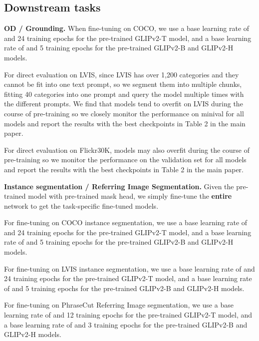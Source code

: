 \documentclass{article}
\newcommand{\ourT}{GLIPv2-T\xspace}
\newcommand{\ourB}{GLIPv2-B\xspace}
\newcommand{\ourH}{GLIPv2-H\xspace}
\begin{document}
\subsection{Downstream tasks}

\textbf{OD / Grounding.} When fine-tuning on COCO, we use a base learning rate of  and 24 training epochs for the pre-trained \ourT model, and a base learning rate of  and 5 training epochs for the pre-trained \ourB and \ourH models.

For direct evaluation on LVIS, since LVIS has over 1,200 categories and they cannot be fit into one text prompt, so we segment them into multiple chunks, fitting 40 categories into one prompt and query the model multiple times with the different prompts. We find that models tend to overfit on LVIS during the course of pre-training so we closely monitor the performance on minival for all models and report the results with the best checkpoints in Table 2 in the main paper.

For direct evaluation on Flickr30K, models may also overfit during the course of pre-training so we monitor the performance on the validation set for all models and report the results with the best checkpoints in Table 2 in the main paper.

\textbf{Instance segmentation / Referring Image Segmentation.} Given the pre-trained model with pre-trained mask head, we simply fine-tune the \textbf{entire} network to get the task-specific fine-tuned models. 

For fine-tuning on COCO instance segmentation, we use a base learning rate of  and 24 training epochs for the pre-trained \ourT model, and a base learning rate of  and 5 training epochs for the pre-trained \ourB and \ourH models.

For fine-tuning on LVIS instance segmentation, we use a base learning rate of  and 24 training epochs for the pre-trained \ourT model, and a base learning rate of  and 5 training epochs for the pre-trained \ourB and \ourH models.

For fine-tuning on PhraseCut Referring Image segmentation, we use a base learning rate of  and 12 training epochs for the pre-trained \ourT model, and a base learning rate of  and 3 training epochs for the pre-trained \ourB and \ourH models.
\end{document}
